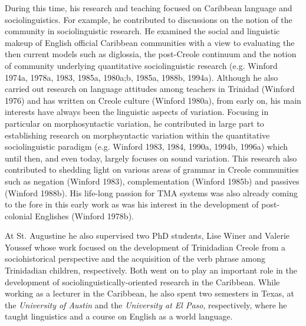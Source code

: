 \documentclass[output=paper, colorlinks,citecolor=brown]{langscibook}
\begin{document}
During this time, his research and teaching focused on Caribbean language and sociolinguistics. For example, he contributed to discussions on the notion of the community in sociolinguistic research. He examined the social and linguistic makeup of English official Caribbean communities with a view to evaluating the then current models such as diglossia, the post-Creole continuum and the notion of community underlying quantitative sociolinguistic research (e.g. Winford 1974a, 1978a, 1983, 1985a, 1980a;b, 1985a, 1988b, 1994a). Although he also carried out research on language attitudes among teachers in Trinidad (Winford 1976) and has written on Creole culture (Winford 1980a), from early on, his main interests have always been the linguistic aspects of variation.  Focusing in particular on morphosyntactic variation, he contributed in large part to establishing research on morphsyntactic variation within the quantitative sociolinguistic paradigm (e.g. Winford 1983, 1984, 1990a, 1994b, 1996a) which until then, and even today, largely focuses on sound variation. This research also contributed to shedding light on various areas of grammar in Creole communities such as negation (Winford 1983), complementation (Winford 1985b)  and passives (Winford 1988b). His life-long passion for TMA systems was also already coming to the fore in this early work as was his interest in the development of post-colonial Englishes (Winford 1978b). 
 
At St. Augustine he also supervised two PhD students, Lise Winer and Valerie Youssef whose work focused on the development of Trinidadian Creole from a sociohistorical perspective and the acquisition of the verb phrase among Trinidadian children, respectively. Both went on to play an important role in the development of sociolinguistically-oriented research in the Caribbean. While working as a lecturer in the Caribbean, he also spent two semesters in Texas, at the \textit{University of Austin} and the \textit{University at El Paso}, respectively, where he taught linguistics and a course on English as a world language.
\end{document}
